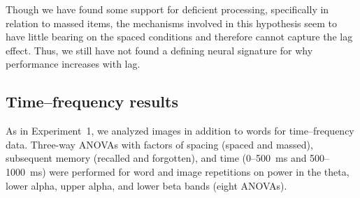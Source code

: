 

Though we have found some support for deficient processing, specifically in relation to massed items, the mechanisms involved in this hypothesis seem to have little bearing on the spaced conditions and therefore cannot capture the lag effect.  Thus, we still have not found a defining neural signature for why performance increases with lag.

\subsection{Time--frequency results}

As in Experiment~1, we analyzed images in addition to words for time--frequency data.
Three-way ANOVAs with factors of spacing (spaced and massed), subsequent memory (recalled and forgotten), and time (0--500~ms and 500--1000~ms) were performed for word and image repetitions on power in the theta, lower alpha, upper alpha, and lower beta bands (eight ANOVAs).


